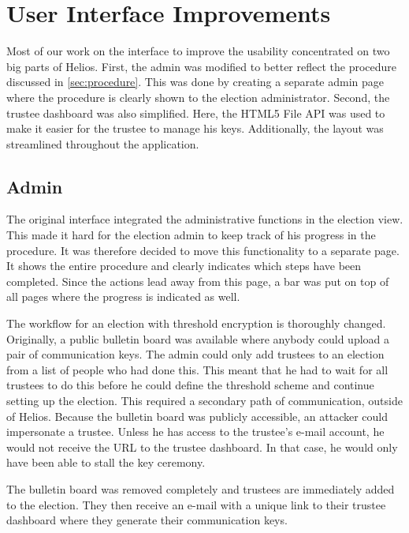 % 
%

\section{User Interface Improvements}
\label{sec:user_interface_improvements}

Most of our work on the interface to improve the usability concentrated on two big parts of Helios. First, the admin was modified to better reflect the procedure discussed in \ref{sec:procedure}. This was done by creating a separate admin page where the procedure is clearly shown to the election administrator. Second, the trustee dashboard was also simplified. Here, the HTML5 File API was used to make it easier for the trustee to manage his keys. Additionally, the layout was streamlined throughout the application. 

\subsection{Admin}

The original interface integrated the administrative functions in the election view. This made it hard for the election admin to keep track of his progress in the procedure. It was therefore decided to move this functionality to a separate page. It shows the entire procedure and clearly indicates which steps have been completed. Since the actions lead away from this page, a bar was put on top of all pages where the progress is indicated as well.

\par The workflow for an election with threshold encryption is thoroughly changed. Originally, a public bulletin board was available where anybody could upload a pair of communication keys. The admin could only add trustees to an election from a list of people who had done this. This meant that he had to wait for all trustees to do this before he could define the threshold scheme and continue setting up the election. This required a secondary path of communication, outside of Helios. Because the bulletin board was publicly accessible, an attacker could impersonate a trustee. Unless he has access to the trustee's e-mail account, he would not receive the URL to the trustee dashboard. In that case, he would only have been able to stall the key ceremony.

\par The bulletin board was removed completely and trustees are immediately added to the election. They then receive an e-mail with a unique link to their trustee dashboard where they generate their communication keys.


